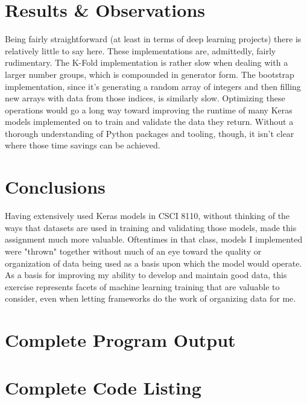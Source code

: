 \documentclass{article}
\begin{document}
\section{Results \& Observations} \label{observations}
Being fairly straightforward (at least in terms of deep learning projects) there is relatively little to say here.
These implementations are, admittedly, fairly rudimentary.
The K-Fold implementation is rather slow when dealing with a larger number groups, which is compounded in generator form.
The bootstrap implementation, since it's generating a random array of integers and then filling new arrays with data from those indices, is similarly slow.
Optimizing these operations would go a long way toward improving the runtime of many Keras models implemented on to train and validate the data they return.
Without a thorough understanding of Python packages and tooling, though, it isn't clear where those time savings can be achieved.

\section{Conclusions}
Having extensively used Keras models in CSCI 8110, without thinking of the ways that datasets are used in training and validating those models, made this assignment much more valuable.
Oftentimes in that class, models I implemented were "thrown" together without much of an eye toward the quality or organization of data being used as a basis upon which the model would operate.
As a basis for improving my ability to develop and maintain good data, this exercise represents facets of machine learning training that are valuable to consider, even when letting frameworks do the work of organizing data for me.

\newpage
\begin{appendices}
\section{Complete Program Output} \label{completeout}

\section{Complete Code Listing} \label{codelist}

\end{appendices}
\end{document}
